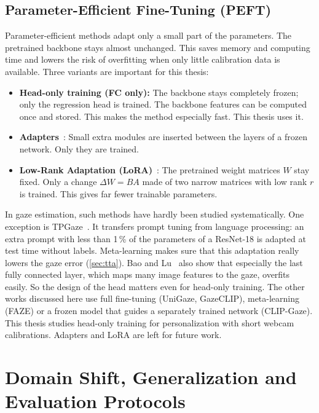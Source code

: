 \subsection{Parameter-Efficient Fine-Tuning (PEFT)}
\label{subsec:peft}
Parameter-efficient methods adapt only a small part of the parameters. The
pretrained backbone stays almost unchanged. This saves memory and computing
time and lowers the risk of overfitting when only little calibration data is
available. Three variants are important for this thesis:
\begin{itemize}
  \item \textbf{Head-only training (FC only):} The backbone stays completely
        frozen; only the regression head is trained. The backbone features can
        be computed once and stored. This makes the method especially fast.
        This thesis uses it.
  \item \textbf{Adapters}~\cite{houlsby2019adapter}: Small extra modules are
        inserted between the layers of a frozen network. Only they are
        trained.
  \item \textbf{Low-Rank Adaptation (LoRA)}~\cite{hu2022lora}: The pretrained
        weight matrices $W$ stay fixed. Only a change $\Delta W = BA$ made of
        two narrow matrices with low rank $r$ is trained. This gives far fewer
        trainable parameters.
\end{itemize}
In gaze estimation, such methods have hardly been studied systematically. One
exception is TPGaze~\cite{liu2024tpgaze}. It transfers prompt tuning from
language processing: an extra prompt with less than 1\,\% of the parameters of
a ResNet-18 is adapted at test time without labels. Meta-learning makes sure
that this adaptation really lowers the gaze error (\cref{sec:tta}). Bao and
Lu~\cite{bao2024feature2gaze} also show that especially the last fully
connected layer, which maps many image features to the gaze, overfits easily.
So the design of the head matters even for head-only training. The other works
discussed here use full fine-tuning (UniGaze, GazeCLIP), meta-learning (FAZE)
or a frozen model that guides a separately trained network (CLIP-Gaze). This
thesis studies head-only training for personalization with short webcam
calibrations. Adapters and LoRA are left for future work.

\section{Domain Shift, Generalization and Evaluation Protocols}
\label{sec:domain_shift}

